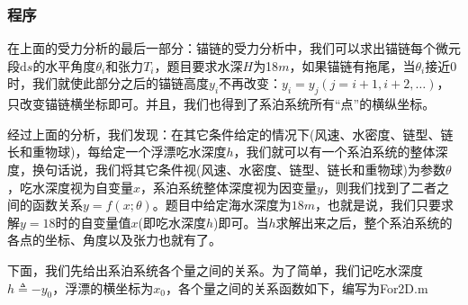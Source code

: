         \subsubsection{程序}
            \par
            在上面的受力分析的最后一部分：锚链的受力分析中，我们可以求出锚链每个微元段$\mathrm{d}s$的水平角度$\theta_i$和张力$T_i$，题目要求水深$H$为18$m$，如果锚链有拖尾，当$\theta_i$接近0时，我们就使此部分之后的锚链高度$y_i$不再改变：$y_i = y_{j}(j = i+1,i+2,\dots)$，只改变锚链横坐标即可。并且，我们也得到了系泊系统所有“点”的横纵坐标。
            \par
            经过上面的分析，我们发现：在其它条件给定的情况下(风速、水密度、链型、链长和重物球)，每给定一个浮漂吃水深度$h$，我们就可以有一个系泊系统的整体深度，换句话说，我们将其它条件视(风速、水密度、链型、链长和重物球)为参数$\theta$，吃水深度视为自变量$x$，系泊系统整体深度视为因变量$y$，则我们找到了二者之间的函数关系$y = f(x;\theta)$。题目中给定海水深度为$18m$，也就是说，我们只要求解$y=18$时的自变量值$x$(即吃水深度$h$)即可。当$h$求解出来之后，整个系泊系统的各点的坐标、角度以及张力也就有了。
            \par
            下面，我们先给出系泊系统各个量之间的关系。为了简单，我们记吃水深度$h\triangleq  -y_0$，浮漂的横坐标为$x_0$，各个量之间的关系函数如下，编写为For2D.m

